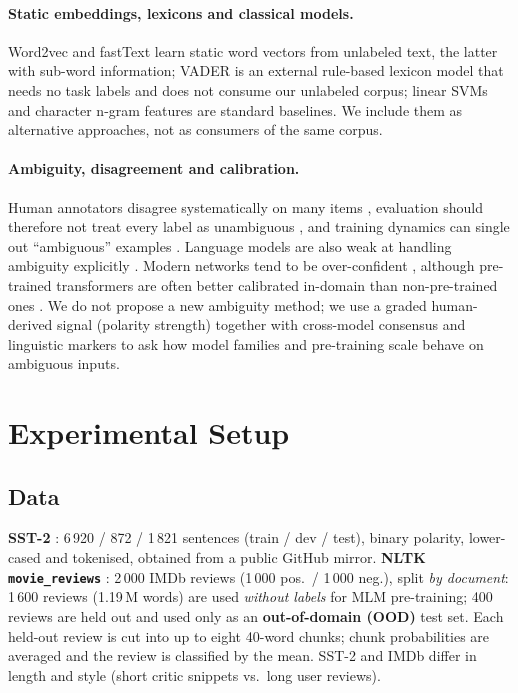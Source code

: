\documentclass[11pt,a4paper]{article}
\begin{document}
\paragraph{Static embeddings, lexicons and classical models.} Word2vec \cite{mikolov2013efficient,mikolov2013distributed} and fastText \cite{bojanowski2017enriching} learn static word vectors from unlabeled text, the latter with sub-word information;
VADER \cite{hutto2014vader} is an external rule-based lexicon model that needs no task labels and does not consume our unlabeled corpus; linear SVMs \cite{cortes1995support} and character n-gram features are standard baselines. We include them as alternative approaches, not as consumers of the same corpus.

\paragraph{Ambiguity, disagreement and calibration.} Human annotators disagree systematically on many items \cite{pavlick2019inherent,nie2020can,plank2022problem}, evaluation should therefore not treat every label as unambiguous \cite{baan2022stop}, and
training dynamics can single out ``ambiguous'' examples \cite{swayamdipta2020dataset}. Language models are also weak at handling ambiguity explicitly \cite{liu2023afraid}. Modern networks tend to be over-confident \cite{guo2017calibration}, although pre-trained transformers are often better calibrated in-domain than non-pre-trained ones \cite{desai2020calibration}.
We do not propose a new ambiguity method; we use a graded human-derived signal (polarity strength) together with cross-model consensus and linguistic markers to ask how model families and pre-training scale behave on ambiguous inputs.

\section{Experimental Setup}
\subsection{Data}
\textbf{SST-2} \cite{socher2013recursive}: 6\,920 / 872 / 1\,821 sentences (train / dev / test), binary polarity, lower-cased and tokenised, obtained from a public GitHub mirror.
\textbf{NLTK \texttt{movie\_reviews}} \cite{pang2004sentimental}: 2\,000 IMDb reviews (1\,000 pos.\ / 1\,000 neg.), split \emph{by document}:
1\,600 reviews (1.19\,M words) are used \emph{without labels} for MLM pre-training; 400 reviews are held out and used only as an \textbf{out-of-domain (OOD)} test set.
Each held-out review is cut into up to eight 40-word chunks; chunk probabilities are averaged and the review is classified by the mean.
SST-2 and IMDb differ in length and style (short critic snippets vs.\ long user reviews).
\end{document}
